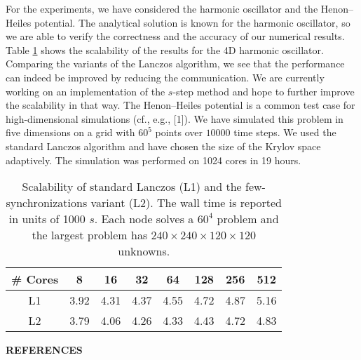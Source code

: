 \documentclass{report}
\begin{document}
For the experiments, we have considered the harmonic oscillator and the
Henon--Heiles potential. The analytical solution is known for the
harmonic oscillator, so we are able to verify the correctness and the
accuracy of our numerical results. Table \ref{tab:1} shows the
scalability of the results for the 4D harmonic oscillator. Comparing the
variants of the Lanczos algorithm, we see that the performance can indeed
be improved by reducing the communication. We are currently working on an
implementation of the $s$-step method and hope to further improve the
scalability in that way. The Henon--Heiles potential is a common test
case for high-dimensional simulations (cf., e.g., [1]). We have simulated
this problem in five dimensions on a grid with $60^5$ points over $10000$
time steps. We used the standard Lanczos algorithm and have chosen the
size of the Krylov space adaptively. The simulation was performed on 1024
cores in 19 hours.

\begin{table}[htdp]
\caption{\small{Scalability of standard Lanczos (L1) and the
few-synchronizations variant (L2). The wall time is reported in units of
1000 $s$. Each node solves a $60^{4}$ problem and the largest problem has
$240 \times 240 \times 120 \times 120$ unknowns.}}
\begin{center}
\begin{tabular}{|c|c|c|c|c|c|c|c|}
\hline
\# Cores & 8 & 16 & 32 & 64 & 128 & 256 & 512 \\
\hline
L1& 3.92& 4.31& 4.37& 4.55& 4.72& 4.87& 5.16 \\
L2& 3.79& 4.06& 4.26& 4.33& 4.43& 4.72& 4.83 \\
\hline
\end{tabular}
\end{center}
\label{tab:1}
\end{table}%


\begin{center}
{\bf REFERENCES}\\[-3mm]
\end{center}
\end{document}
